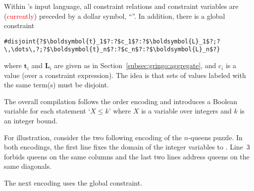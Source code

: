 Within \gringo's input language,
all constraint relations and constraint variables are (\textcolor{red}{currently}) preceded by a dollar symbol, ``\var{\$}''.
In addition, there is a global constraint
\begin{lstlisting}[numbers=none,escapechar=?]
#disjoint{?$\boldsymbol{t}_1$?:?$c_1$?:?$\boldsymbol{L}_1$?;?\,\dots\,?;?$\boldsymbol{t}_n$?:?$c_n$?:?$\boldsymbol{L}_n$?}
\end{lstlisting}
where $\boldsymbol{t}_i$ and $\boldsymbol{L}_i$ are given as in Section~\ref{subsec:gringo:aggregate},
and $c_i$ is a value (over a constraint expression).
%
The idea is that sets of values labeled with the same term(s) must be disjoint.

The overall compilation follows the order encoding \cite{tatakiba09a,bageinscsotawe13a} and
introduces a Boolean variable for each statement `$X\leq k$' where $X$ is a variable over integers and $k$ is an integer bound.

For illustration,
consider the two following encoding of the $n$-queens puzzle.
In both encodings, the first line fixes the domain of the integer variables 
 to .
Line~3 forbids queens on the same columns and the last two lines address queens on the same diagonals.
%

The next encoding uses the global  constraint.


